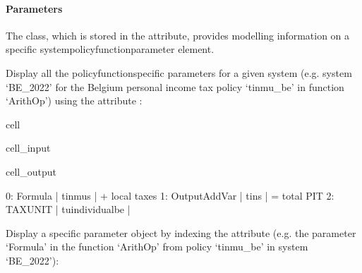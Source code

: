 \documentclass[letterpaper,10pt,english]{sphinxmanual}
\begin{document}
\paragraph{Parameters}
\label{\detokenize{userguide:id6}}
\sphinxAtStartPar
The  class, which is stored in the  attribute, provides modelling information on a specific system\sphinxhyphen{}policy\sphinxhyphen{}function\sphinxhyphen{}parameter element.

\sphinxAtStartPar
Display all the policy\sphinxhyphen{}function\sphinxhyphen{}specific parameters for a given system (e.g. system ‘BE\_2022’ for the Belgium personal income tax policy ‘tinmu\_be’ in function ‘ArithOp’) using the attribute :

\begin{sphinxuseclass}{cell}
\begin{sphinxuseclass}{cell_input}
\begin{sphinxVerbatim}[commandchars=\\\{\}]
\PYG{p}{[}\PYG{p}{]}\PYG{p}{[}\PYG{p}{]}\PYG{p}{[}\PYG{p}{]}\PYG{p}{[}\PYG{p}{]}
\end{sphinxVerbatim}

\end{sphinxuseclass}
\begin{sphinxuseclass}{cell_output}
\begin{sphinxVerbatim}[commandchars=\\\{\}]
0: Formula            | tinmu\PYGZus{}s               |    + local taxes 
1: Output\PYGZus{}Add\PYGZus{}Var     | tin\PYGZus{}s                 |    = total PIT 
2: TAX\PYGZus{}UNIT           | tu\PYGZus{}individual\PYGZus{}be      |     
\end{sphinxVerbatim}

\end{sphinxuseclass}
\end{sphinxuseclass}
\sphinxAtStartPar
Display a specific parameter object by indexing the  attribute (e.g. the parameter ‘Formula’ in the function ‘ArithOp’ from policy ‘tinmu\_be’ in system ‘BE\_2022’):
\end{document}
